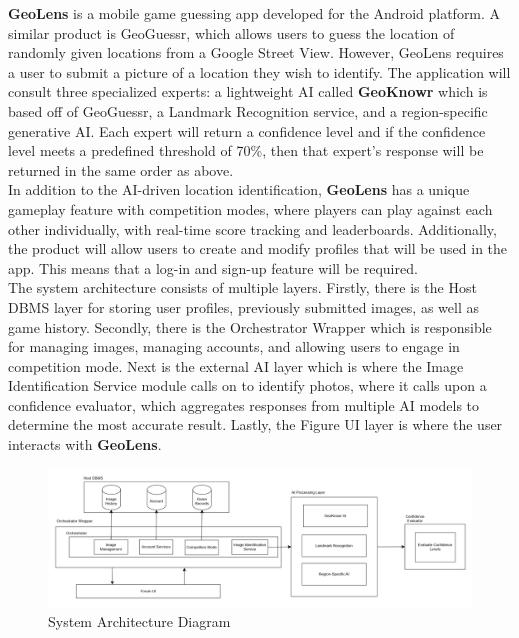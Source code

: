 \documentclass[]{article}
\begin{document}
\noindent \textbf{GeoLens} is a mobile game guessing app developed for the Android platform. A similar product is GeoGuessr, which allows users to guess the location of randomly given locations from a Google Street View. However, GeoLens requires a user to submit a picture of a location they wish to identify. The application will consult three specialized experts: a lightweight AI called \textbf{GeoKnowr} which is based off of GeoGuessr, a Landmark Recognition service, and a region-specific generative AI. Each expert will return a confidence level and if the confidence level meets a predefined threshold of 70\%, then that expert's response will be returned in the same order as above.\\

\noindent In addition to the AI-driven location identification, \textbf{GeoLens} has a unique gameplay feature with competition modes, where players can play against each other individually, with real-time score tracking and leaderboards. Additionally, the product will allow users to create and modify profiles that will be used in the app. This means that a log-in and sign-up feature will be required.\\

\noindent The system architecture consists of multiple layers. Firstly, there is the Host DBMS layer for storing user profiles, previously submitted images, as well as game history. Secondly, there is the Orchestrator Wrapper which is responsible for managing images, managing accounts, and allowing users to engage in competition mode. Next is the external AI layer which is where the Image Identification Service module calls on to identify photos, where it calls upon a confidence evaluator, which aggregates responses from multiple AI models to determine the most accurate result. Lastly, the Figure UI layer is where the user interacts with \textbf{GeoLens}.\\

\begin{figure}[h]
    \centering
    \includegraphics[width=1\linewidth]{system_diagram.png}
    \caption{System Architecture Diagram}
    \label{fig:system_diagram}
\end{figure}
\end{document}
